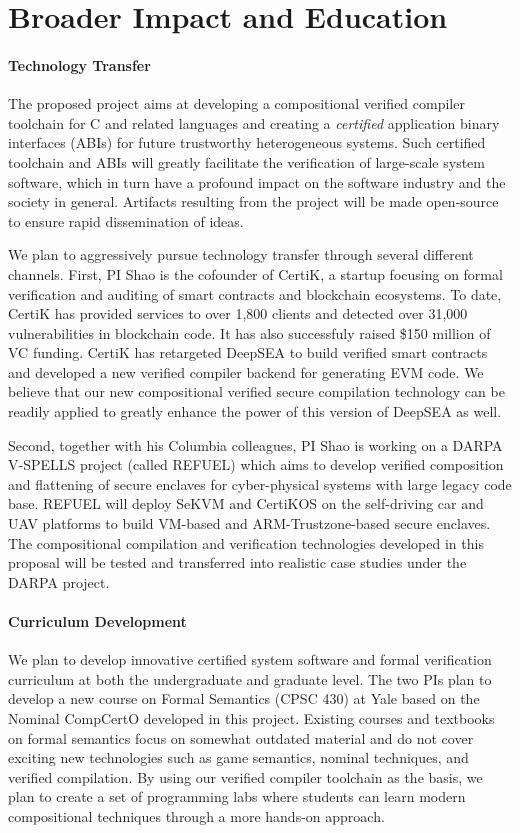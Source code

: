 \section{Broader Impact and Education}
\label{sec:impact}

\paragraph*{Technology Transfer}
The proposed project aims at developing a compositional verified
compiler toolchain for C and related languages and creating a {\em
  certified} application binary interfaces (ABIs) for future
trustworthy heterogeneous systems. Such certified toolchain and ABIs
will greatly facilitate the verification of large-scale system
software, which in turn have a profound impact on the software
industry and the society in general.
Artifacts resulting from the project will be
made open-source to ensure rapid dissemination of ideas.

We plan to aggressively pursue technology transfer through several
different channels. First, PI Shao is the cofounder of CertiK,
a startup focusing on formal verification and auditing of smart
contracts and blockchain ecosystems. To date,
CertiK has provided services to over 1,800 clients and detected
over 31,000 vulnerabilities in blockchain code. It has also
successfuly raised \$150 million of VC funding. CertiK has retargeted
DeepSEA to build verified smart contracts and developed a new
verified compiler backend for generating EVM code. We believe
that our new compositional verified secure compilation technology
can be readily applied to greatly enhance the power of this version
of DeepSEA as well.

Second, together with his Columbia colleagues, PI Shao is working on
a DARPA V-SPELLS project (called REFUEL)
which aims to develop verified composition and flattening of secure
enclaves for cyber-physical systems with large legacy code base.
REFUEL will deploy SeKVM and CertiKOS on the self-driving car
and UAV platforms to build VM-based and ARM-Trustzone-based secure
enclaves. The compositional compilation and verification technologies
developed in this proposal will be tested and transferred into realistic
case studies under the DARPA project.

\paragraph*{Curriculum Development}
We plan to develop innovative certified system software and formal
verification curriculum at both the undergraduate and graduate
level. The two PIs plan to develop a new course on Formal Semantics
(CPSC 430) at Yale based on the Nominal CompCertO developed in this
project. Existing courses and textbooks on formal semantics focus on
somewhat outdated material and do not cover exciting new technologies
such as game semantics, nominal techniques, and verified
compilation. By using our verified compiler toolchain as the basis, we
plan to create a set of programming labs where students can learn
modern compositional techniques through a more hands-on approach.

